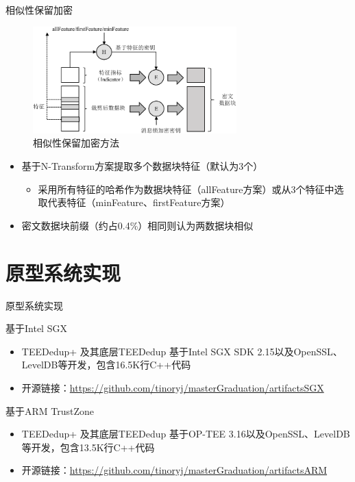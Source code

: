 \documentclass{beamer}
\newcommand{\sysnameS}{TEEDedup }
\newcommand{\prototype}{TEEDedup+ }
\begin{document}
\begin{frame}{相似性保留加密}
    \begin{figure}[!htb]
        \centering
        \includegraphics[width=0.7\textwidth]{../pic/featurespy/spe.pdf}
        \caption{相似性保留加密方法}
        \label{fig:featurespy-design-spe}
    \end{figure}
    \vspace{-1.5em}
    \begin{itemize}
        \item
              基于N-Transform方案提取多个数据块特征（默认为3个）
              \begin{itemize}
                \item 采用所有特征的哈希作为数据块特征（allFeature方案）或从3个特征中选取代表特征（minFeature、firstFeature方案）
              \end{itemize}
        \item  密文数据块前缀（约占0.4\%）相同则认为两数据块相似
    \end{itemize}
\end{frame}

\section{原型系统实现}

\begin{frame}{原型系统实现}
    \begin{textbox}{基于Intel SGX}
        \begin{itemize}
            \item \prototype 及其底层\sysnameS 基于Intel SGX SDK 2.15以及OpenSSL、LevelDB等开发，包含16.5K行C++代码
            \item 开源链接：\href{https://github.com/tinoryj/masterGraduation/artifactsSGX}{https://github.com/tinoryj/masterGraduation/artifactsSGX}
        \end{itemize}
    \end{textbox}

    \begin{textbox}{基于ARM TrustZone}
        \begin{itemize}
            \item \prototype 及其底层\sysnameS 基于OP-TEE 3.16以及OpenSSL、LevelDB等开发，包含13.5K行C++代码
            \item 开源链接：\href{https://github.com/tinoryj/masterGraduation/artifactsARM}{https://github.com/tinoryj/masterGraduation/artifactsARM}
        \end{itemize}
    \end{textbox}
\end{frame}
\end{document}
